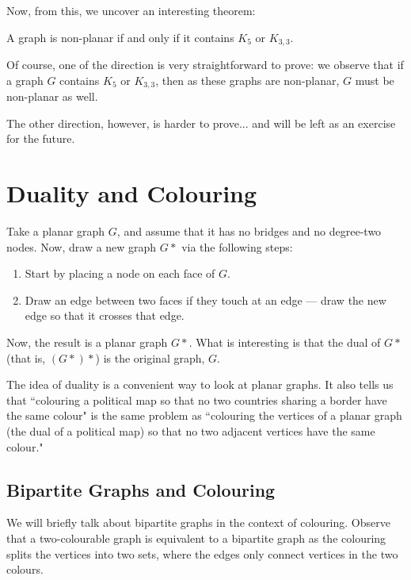 \documentclass[openany]{book}
\begin{document}
Now, from this, we uncover an interesting theorem:
\begin{thm}
	A graph is non-planar if and only if it contains $K_{5}$ or $K_{3,3}$.
\end{thm}

Of course, one of the direction is very straightforward to prove: we observe that if a graph $G$ contains $K_{5}$ or $K_{3,3}$, then as these graphs are non-planar, $G$ must be non-planar as well.

The other direction, however, is harder to prove... and will be left as an exercise for the future.

\section{Duality and Colouring}
\begin{defn}[Duality]
	Take a planar graph $G$, and assume that it has no bridges and no degree-two nodes. Now, draw a new graph $G*$ via the following steps:
	\begin{enumerate}
		\item Start by placing a node on each face of $G$.
		\item Draw an edge between two faces if they touch at an edge --- draw the new edge so that it crosses that edge.
	\end{enumerate}
	Now, the result is a planar graph $G*$. What is interesting is that the dual of $G*$ (that is, $(G*)*$) is the original graph, $G$.
\end{defn}

The idea of duality is a convenient way to look at planar graphs. It also tells us that ``colouring a political map so that no two countries sharing a border have the same colour" is the same problem as ``colouring the vertices of a planar graph (the dual of a political map) so that no two adjacent vertices have the same colour."

\subsection{Bipartite Graphs and Colouring}
We will briefly talk about bipartite graphs in the context of colouring. Observe that a two-colourable graph is equivalent to a bipartite graph as the colouring splits the vertices into two sets, where the edges only connect vertices in the two colours.
\end{document}
